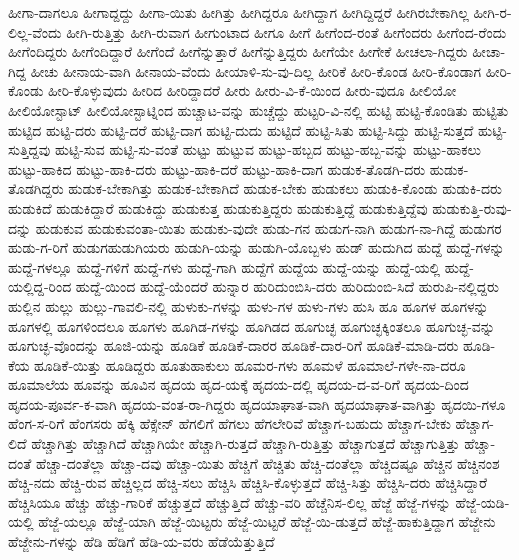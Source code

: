 {ಹೀಗಾ-ದಾಗಲೂ
ಹೀಗಾದ್ದದ್ದು
ಹೀಗಾ-ಯಿತು
ಹೀಗಿತ್ತು
ಹೀಗಿದ್ದರೂ
ಹೀಗಿದ್ದಾಗ
ಹೀಗಿದ್ದಿದ್ದರೆ
ಹೀಗಿರಬೇಕಾಗಿಲ್ಲ
ಹೀಗಿ-ರ-ಲಿಲ್ಲ-ವೆಂದು
ಹೀಗಿ-ರುತ್ತಿತ್ತು
ಹೀಗಿ-ರುವಾಗ
ಹೀಗುಂಟಾದ
ಹೀಗೂ
ಹೀಗೆ
ಹೀಗೆಂದ-ರಂತೆ
ಹೀಗೆಂದರು
ಹೀಗೆಂದ-ರೆಂದು
ಹೀಗೆಂದಿದ್ದರು
ಹೀಗೆಂದಿದ್ದಾರೆ
ಹೀಗೆಂದೆ
ಹೀಗೆನ್ನುತ್ತಾರೆ
ಹೀಗೆನ್ನುತ್ತಿದ್ದರು
ಹೀಗೆಯೇ
ಹೀಗೇಕೆ
ಹೀಚಲಾ-ಗಿದ್ದರು
ಹೀಚಾ-ಗಿದ್ದ
ಹೀಚು
ಹೀನಾಯ-ವಾಗಿ
ಹೀನಾಯ-ವೆಂದು
ಹೀಯಾಳಿ-ಸು-ವು-ದಿಲ್ಲ
ಹೀರಿಕೆ
ಹೀರಿ-ಕೊಂಡ
ಹೀರಿ-ಕೊಂಡಾಗ
ಹೀರಿ-ಕೊಂಡು
ಹೀರಿ-ಕೊಳ್ಳುವುದು
ಹೀರಿದ
ಹೀರಿದ್ದಾದರೆ
ಹೀರು
ಹೀರು-ವಿ-ಕೆ-ಯಿಂದ
ಹೀರು-ವುದೂ
ಹೀಲಿಯೋ
ಹೀಲಿಯೋಸ್ಟಾಟ್
ಹೀಲಿಯೋಸ್ಟಾಟ್ನಿಂದ
ಹುಚ್ಚಾಟ-ವನ್ನು
ಹುಚ್ಚೆದ್ದು
ಹುಟ್ಟರಿ-ವಿ-ನಲ್ಲಿ
ಹುಟ್ಟಿ
ಹುಟ್ಟಿ-ಕೊಂಡಿತು
ಹುಟ್ಟಿತು
ಹುಟ್ಟಿದ
ಹುಟ್ಟಿ-ದರು
ಹುಟ್ಟಿ-ದರೆ
ಹುಟ್ಟಿ-ದಾಗ
ಹುಟ್ಟಿ-ದುದು
ಹುಟ್ಟಿದೆ
ಹುಟ್ಟಿ-ಸಿತು
ಹುಟ್ಟಿ-ಸಿದ್ದು
ಹುಟ್ಟಿ-ಸುತ್ತದೆ
ಹುಟ್ಟಿ-ಸುತ್ತಿದ್ದವು
ಹುಟ್ಟಿ-ಸುವ
ಹುಟ್ಟಿ-ಸು-ವಂತೆ
ಹುಟ್ಟು
ಹುಟ್ಟುವ
ಹುಟ್ಟು-ಹಬ್ಬದ
ಹುಟ್ಟು-ಹಬ್ಬ-ವನ್ನು
ಹುಟ್ಟು-ಹಾಕಲು
ಹುಟ್ಟು-ಹಾಕಿದ
ಹುಟ್ಟು-ಹಾಕಿ-ದರು
ಹುಟ್ಟು-ಹಾಕಿ-ದರೆ
ಹುಟ್ಟು-ಹಾಕಿ-ದಾಗ
ಹುಡುಕ-ತೊಡಗಿ-ದರು
ಹುಡುಕ-ತೊಡಗಿದ್ದರು
ಹುಡುಕ-ಬೇಕಾಗಿತ್ತು
ಹುಡುಕ-ಬೇಕಾಗಿದೆ
ಹುಡುಕ-ಬೇಕು
ಹುಡುಕಲು
ಹುಡುಕಿ-ಕೊಂಡು
ಹುಡುಕಿ-ದರು
ಹುಡುಕಿದೆ
ಹುಡುಕಿದ್ದಾರೆ
ಹುಡುಕಿದ್ದು
ಹುಡುಕುತ್ತ
ಹುಡುಕುತ್ತಿದ್ದರು
ಹುಡುಕುತ್ತಿದ್ದೆ
ಹುಡುಕುತ್ತಿದ್ದೆವು
ಹುಡುಕುತ್ತಿ-ರುವು-ದನ್ನು
ಹುಡುಕುವ
ಹುಡುಕುವಂತಾ-ಯಿತು
ಹುಡುಕು-ವುದೇ
ಹುಡು-ಗನ
ಹುಡುಗ-ನಾಗಿ
ಹುಡುಗ-ನಾ-ಗಿದ್ದೆ
ಹುಡುಗರ
ಹುಡು-ಗ-ರಿಗೆ
ಹುಡುಗಹುಡುಗಿಯರು
ಹುಡುಗಿ-ಯನ್ನು
ಹುಡುಗಿ-ಯೊಬ್ಬಳು
ಹುಡ್
ಹುದುಗಿದ
ಹುದ್ದೆ
ಹುದ್ದೆ-ಗಳನ್ನು
ಹುದ್ದೆ-ಗಳಲ್ಲೂ
ಹುದ್ದೆ-ಗಳಿಗೆ
ಹುದ್ದೆ-ಗಳು
ಹುದ್ದೆ-ಗಾಗಿ
ಹುದ್ದೆಗೆ
ಹುದ್ದೆಯ
ಹುದ್ದೆ-ಯನ್ನು
ಹುದ್ದೆ-ಯಲ್ಲಿ
ಹುದ್ದೆ-ಯಲ್ಲಿದ್ದ-ರಿಂದ
ಹುದ್ದೆ-ಯಿಂದ
ಹುದ್ದೆ-ಯೆಂದರೆ
ಹುನ್ನಾರ
ಹುರಿದುಂಬಿಸಿ-ದರು
ಹುರಿದುಂಬಿ-ಸಿದೆ
ಹುರುಪಿ-ನಲ್ಲಿದ್ದರು
ಹುಲ್ಲಿನ
ಹುಲ್ಲು
ಹುಲ್ಲು-ಗಾವಲಿ-ನಲ್ಲಿ
ಹುಳುಕು-ಗಳನ್ನು
ಹುಳು-ಗಳ
ಹುಳು-ಗಳು
ಹುಸಿ
ಹೂ
ಹೂಗಳ
ಹೂಗಳನ್ನು
ಹೂಗಳಲ್ಲಿ
ಹೂಗಳಿಂದಲೂ
ಹೂಗಳು
ಹೂಗಿಡ-ಗಳನ್ನು
ಹೂಗಿಡದ
ಹೂಗುಚ್ಛ
ಹೂಗುಚ್ಛಕ್ಕಿಂತಲೂ
ಹೂಗುಚ್ಛ-ವನ್ನು
ಹೂಗುಚ್ಛ-ವೊಂದನ್ನು
ಹೂಜಿ-ಯನ್ನು
ಹೂಡಿಕೆ
ಹೂಡಿಕೆ-ದಾರರ
ಹೂಡಿಕೆ-ದಾರ-ರಿಗೆ
ಹೂಡಿಕೆ-ಮಾಡಿ-ದರು
ಹೂಡಿ-ಕೆಯ
ಹೂಡಿಕೆ-ಯಿತ್ತು
ಹೂಡಿದ್ದರು
ಹೂತುಹಾಕುಲು
ಹೂಮರ-ಗಳು
ಹೂಮಳೆ
ಹೂಮಾಲೆ-ಗಳೇ-ನಾ-ದರೂ
ಹೂಮಾಲೆಯ
ಹೂವನ್ನು
ಹೂವಿನ
ಹೃದಯ
ಹೃದ-ಯಕ್ಕೆ
ಹೃದಯ-ದಲ್ಲಿ
ಹೃದಯ-ದ-ವ-ರಿಗೆ
ಹೃದಯ-ದಿಂದ
ಹೃದಯ-ಪೂರ್ವ-ಕ-ವಾಗಿ
ಹೃದಯ-ವಂತ-ರಾ-ಗಿದ್ದರು
ಹೃದಯಾಘಾತ-ವಾಗಿ
ಹೃದಯಾಘಾತ-ವಾಗಿತ್ತು
ಹೃದಯಿ-ಗಳೂ
ಹೆಂಗ-ಸ-ರಿಗೆ
ಹೆಂಗಸರು
ಹೆಕ್ಕಿ
ಹೆಕ್ಸೇನ್
ಹೆಗಲಿಗೆ
ಹೆಗಲು
ಹೆಗಲೇರಿವೆ
ಹೆಚ್ಚಾಗ-ಬಹುದು
ಹೆಚ್ಚಾಗ-ಬೇಕು
ಹೆಚ್ಚಾಗ-ಲಿದೆ
ಹೆಚ್ಚಾಗಿತ್ತು
ಹೆಚ್ಚಾಗಿದೆ
ಹೆಚ್ಚಾಗಿಯೇ
ಹೆಚ್ಚಾಗಿ-ರುತ್ತದೆ
ಹೆಚ್ಚಾಗಿ-ರುತ್ತಿತ್ತು
ಹೆಚ್ಚಾಗುತ್ತದೆ
ಹೆಚ್ಚಾಗುತ್ತಿತ್ತು
ಹೆಚ್ಚಾ-ದಂತೆ
ಹೆಚ್ಚಾ-ದಂತೆಲ್ಲಾ
ಹೆಚ್ಚಾ-ದವು
ಹೆಚ್ಚಾ-ಯಿತು
ಹೆಚ್ಚಿಗೆ
ಹೆಚ್ಚಿತು
ಹೆಚ್ಚಿ-ದಂತೆಲ್ಲಾ
ಹೆಚ್ಚಿದಷ್ಟೂ
ಹೆಚ್ಚಿನ
ಹೆಚ್ಚಿನಂಶ
ಹೆಚ್ಚಿ-ನದು
ಹೆಚ್ಚಿ-ರುವ
ಹೆಚ್ಚಿಲ್ಲದ
ಹೆಚ್ಚಿ-ಸಲು
ಹೆಚ್ಚಿಸಿ
ಹೆಚ್ಚಿಸಿ-ಕೊಳ್ಳುತ್ತದೆ
ಹೆಚ್ಚಿ-ಸಿತ್ತು
ಹೆಚ್ಚಿಸಿ-ದರು
ಹೆಚ್ಚಿಸಿದ್ದಾರೆ
ಹೆಚ್ಚಿಸಿಯೂ
ಹೆಚ್ಚು
ಹೆಚ್ಚು-ಗಾರಿಕೆ
ಹೆಚ್ಚುತ್ತದೆ
ಹೆಚ್ಚುತ್ತಿದೆ
ಹೆಚ್ಚು-ವರಿ
ಹೆಚ್ಚೆನಿಸ-ಲಿಲ್ಲ
ಹೆಜ್ಜೆ
ಹೆಜ್ಜೆ-ಗಳನ್ನು
ಹೆಜ್ಜೆ-ಯಡಿ-ಯಲ್ಲಿ
ಹೆಜ್ಜೆ-ಯಲ್ಲೂ
ಹೆಜ್ಜೆ-ಯಾಗಿ
ಹೆಜ್ಜೆ-ಯಿಟ್ಟರು
ಹೆಜ್ಜೆ-ಯಿಟ್ಟರೆ
ಹೆಜ್ಜೆ-ಯಿ-ಡುತ್ತದೆ
ಹೆಜ್ಜೆ-ಹಾಕುತ್ತಿದ್ದಾಗ
ಹೆಜ್ಜೇನು
ಹೆಜ್ಜೇನು-ಗಳನ್ನು
ಹೆಡಿ
ಹೆಡಿಗೆ
ಹೆಡಿ-ಯ-ವರು
ಹೆಡೆಯೆತ್ತುತ್ತಿದೆ
}

